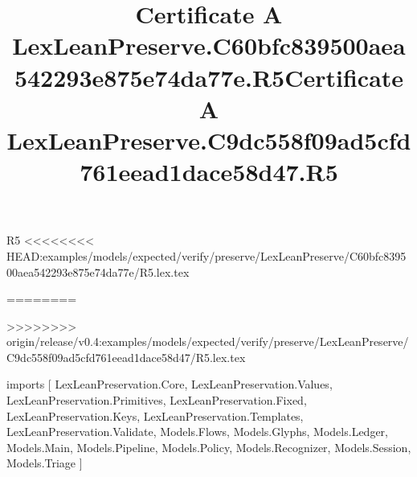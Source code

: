 \begin{lexlean}{R5}
<<<<<<<< HEAD:examples/models/expected/verify/preserve/LexLeanPreserve/C60bfc839500aea542293e875e74da77e/R5.lex.tex
\title{Certificate A LexLeanPreserve.C60bfc839500aea542293e875e74da77e.R5}
========
\title{Certificate A LexLeanPreserve.C9dc558f09ad5cfd761eead1dace58d47.R5}
>>>>>>>> origin/release/v0.4:examples/models/expected/verify/preserve/LexLeanPreserve/C9dc558f09ad5cfd761eead1dace58d47/R5.lex.tex
\begin{coremodule}
imports [
  LexLeanPreservation.Core,
  LexLeanPreservation.Values,
  LexLeanPreservation.Primitives,
  LexLeanPreservation.Fixed,
  LexLeanPreservation.Keys,
  LexLeanPreservation.Templates,
  LexLeanPreservation.Validate,
  Models.Flows,
  Models.Glyphs,
  Models.Ledger,
  Models.Main,
  Models.Pipeline,
  Models.Policy,
  Models.Recognizer,
  Models.Session,
  Models.Triage
]


\end{coremodule}
\end{lexlean}
